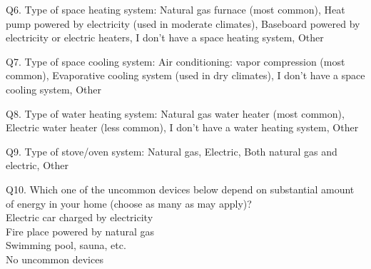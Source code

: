\documentclass[12pt]{article}
\begin{document}
\begin{Form}
Q6. Type of space heating system:
\ChoiceMenu[combo, name=Q6_1, width=8cm, charsize=10pt, default=Natural gas furnace (most common)]{}
{Natural gas furnace (most common), Heat pump powered by electricity (used in moderate climates), Baseboard powered by electricity or electric heaters, I don't have a space heating system, Other}\\
\end{Form}


\begin{Form}
Q7. Type of space cooling system:
\ChoiceMenu[combo, name=Q7_1, width=7cm, charsize=10pt, default=Air conditioning: vapor compression (most common)]{}
{Air conditioning: vapor compression (most common), Evaporative cooling system (used in dry climates), I don't have a space cooling system, Other}\\
\end{Form}


\begin{Form}
Q8. Type of water heating system: 
\ChoiceMenu[combo, name=Q8_1, width=4cm, charsize=10pt, default=Natural gas water heater (most common)]{}
{Natural gas water heater (most common), Electric water heater (less common), I don't have a water heating system, Other }\\
\end{Form}

\begin{Form}
Q9. Type of stove/oven system: 
\ChoiceMenu[combo, name=Q9_1, width=4cm, charsize=10pt, default=Natural gas]{}
{Natural gas, Electric, Both natural gas and electric, Other }\\
\end{Form}


\begin{Form}
Q10. Which one of the uncommon devices below depend on substantial amount of energy in your home (choose as many as may apply)?\\
 Electric car charged by electricity \\
 Fire place powered by natural gas \\
 Swimming pool, sauna, etc. \\
 No uncommon devices \\
\end{Form}
	
\end{document}
